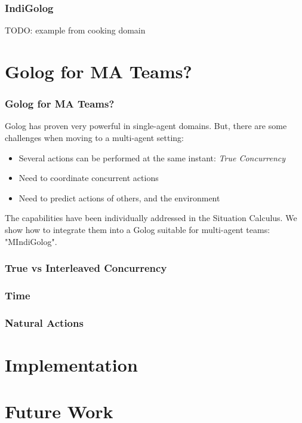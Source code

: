 \documentclass{beamer}
\begin{document}
\begin{frame}
\frametitle{IndiGolog}
TODO: example from cooking domain
\end{frame}


\section{Golog for MA Teams?}

\begin{frame}
\frametitle{Golog for MA Teams?}
Golog has proven very powerful in single-agent domains.  But, there are
some challenges when moving to a multi-agent setting:
\begin{itemize}
  \pause
  \item Several actions can be performed at the same instant:
        \emph{True Concurrency}
  \pause
  \item Need to coordinate concurrent actions
  \pause
  \item Need to predict actions of others, and the environment
\end{itemize}
The capabilities have been individually addressed in the Situation Calculus.
We show how to integrate them into a Golog suitable for multi-agent teams:
"MIndiGolog".
\end{frame}

\begin{frame}
\frametitle{True vs Interleaved Concurrency}
\end{frame}

\begin{frame}
\frametitle{Time}
\end{frame}

\begin{frame}
\frametitle{Natural Actions}
\end{frame}

\section{Implementation}


\section{Future Work}
\end{document}
